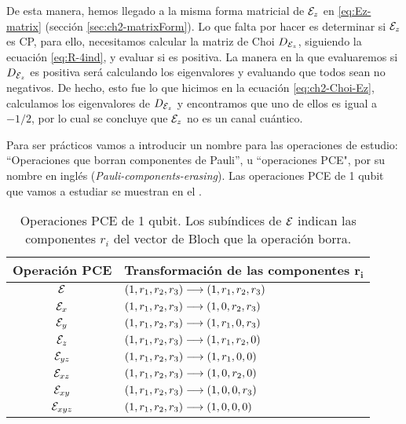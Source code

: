 De esta manera, hemos llegado a la misma forma matricial de $\mathcal{E}_z$
en \eqref{eq:Ez-matrix} (sección \ref{sec:ch2-matrixForm}). 
Lo que falta por hacer es determinar si $\mathcal{E}_z$ es CP, 
para ello, necesitamos calcular la matriz
de Choi $D_{\mathcal{E}_z}$, siguiendo la ecuación \eqref{eq:R-4ind}, y 
evaluar si es positiva. La manera en la que evaluaremos 
si $D_{\mathcal{E}_z}$ es positiva será calculando los eigenvalores 
y evaluando que todos sean no negativos. 
De hecho, esto fue lo que hicimos en 
la ecuación \eqref{eq:ch2-Choi-Ez},
calculamos los eigenvalores de $D_{\mathcal{E}_z}$ y  
encontramos que uno de ellos es igual a $-1/2$, 
por lo cual se concluye que $\mathcal{E}_z$ no es un canal cuántico.

Para ser prácticos vamos a introducir un nombre para
las operaciones de estudio: ``Operaciones
que borran componentes de Pauli'', u ``operaciones PCE",
por su nombre en inglés (\textit{Pauli-components-erasing}). 
Las operaciones PCE de 1 qubit que vamos a estudiar 
se muestran en el .
\begin{table}
\centering
\begin{tabular}{|c|l|} 
\hline
\textbf{Operación PCE} & 
\textbf{Transformación de las componentes} $\mathbf{r_i}$ \\
\hline
$\mathcal{E}_{}$ & \hspace{1.2cm}$\qty(1,r_1,r_2,r_3)\longrightarrow\qty(1,r_1,r_2,r_3)$ \\ 
\hline 
$\mathcal{E}_{x}$ & \hspace{1.2cm}$\qty(1,r_1,r_2,r_3)\longrightarrow\qty(1,0,r_2,r_3)$ \\ 
\hline 
$\mathcal{E}_{y}$ & \hspace{1.2cm}$\qty(1,r_1,r_2,r_3)\longrightarrow\qty(1,r_1,0,r_3)$ \\ 
\hline 
$\mathcal{E}_{z}$ & \hspace{1.2cm}$\qty(1,r_1,r_2,r_3)\longrightarrow\qty(1,r_1,r_2,0)$ \\ 
\hline 
$\mathcal{E}_{yz}$ & \hspace{1.2cm}$\qty(1,r_1,r_2,r_3)\longrightarrow\qty(1,r_1,0,0)$ \\ 
\hline 
$\mathcal{E}_{xz}$ & \hspace{1.2cm}$\qty(1,r_1,r_2,r_3)\longrightarrow\qty(1,0,r_2,0)$ \\ 
\hline 
$\mathcal{E}_{xy}$ & \hspace{1.2cm}$\qty(1,r_1,r_2,r_3)\longrightarrow\qty(1,0,0,r_3)$ \\ 
\hline 
$\mathcal{E}_{xyz}$ & \hspace{1.2cm}$\qty(1,r_1,r_2,r_3)\longrightarrow\qty(1,0,0,0)$ \\ 
\hline
\end{tabular}   
\caption{Operaciones PCE de 1 qubit. 
Los subíndices de $\mathcal{E}$ indican las componentes $r_i$ 
del vector de Bloch que la operación borra.}
\label{cuadro:operacionesPCE-1q}
\end{table}

